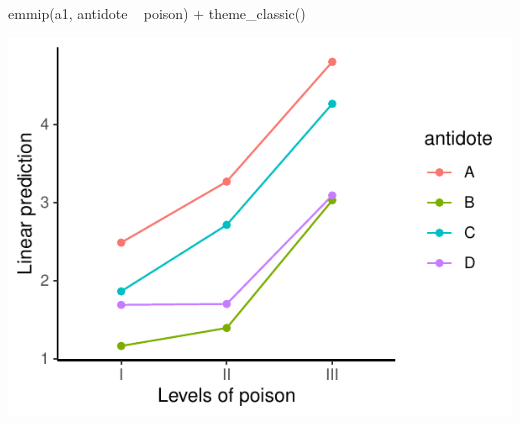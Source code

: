 \documentclass[a4paper]{article}\usepackage[]{graphicx}\usepackage[]{xcolor}
\makeatletter
\def\maxwidth{ %
  \ifdim\Gin@nat@width>\linewidth
    \linewidth
  \else
    \Gin@nat@width
  \fi
}
\makeatother
\begin{document}
\begin{minipage}[t]{0.49\textwidth}
\begin{Schunk}
\begin{Sinput}
emmip(a1, antidote ~ poison) +
  theme_classic()
\end{Sinput}


{\centering \includegraphics[width=\maxwidth]{figure/listings-unnamed-chunk-319-1} 

}

\end{Schunk}
\end{minipage}
\end{document}
